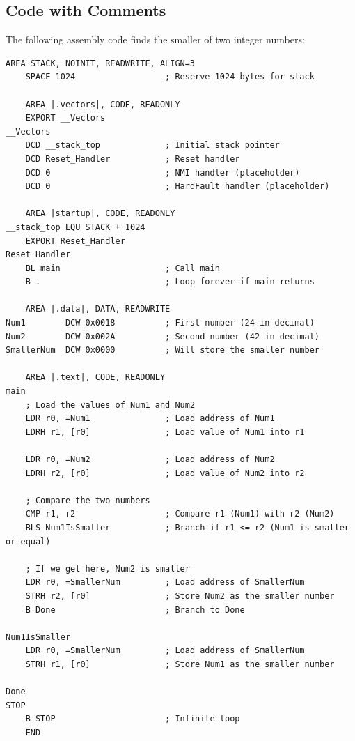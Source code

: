 \documentclass[12pt,a4paper]{article}
\begin{document}
\subsection{Code with Comments}
The following assembly code finds the smaller of two integer numbers:

\begin{lstlisting}[language={}]
    AREA STACK, NOINIT, READWRITE, ALIGN=3
    SPACE 1024                  ; Reserve 1024 bytes for stack
    
    AREA |.vectors|, CODE, READONLY
    EXPORT __Vectors
__Vectors
    DCD __stack_top             ; Initial stack pointer
    DCD Reset_Handler           ; Reset handler
    DCD 0                       ; NMI handler (placeholder)
    DCD 0                       ; HardFault handler (placeholder)
    
    AREA |startup|, CODE, READONLY
__stack_top EQU STACK + 1024
    EXPORT Reset_Handler
Reset_Handler
    BL main                     ; Call main
    B .                         ; Loop forever if main returns
    
    AREA |.data|, DATA, READWRITE
Num1        DCW 0x0018          ; First number (24 in decimal)
Num2        DCW 0x002A          ; Second number (42 in decimal)
SmallerNum  DCW 0x0000          ; Will store the smaller number
    
    AREA |.text|, CODE, READONLY
main
    ; Load the values of Num1 and Num2
    LDR r0, =Num1               ; Load address of Num1
    LDRH r1, [r0]               ; Load value of Num1 into r1
    
    LDR r0, =Num2               ; Load address of Num2
    LDRH r2, [r0]               ; Load value of Num2 into r2
    
    ; Compare the two numbers
    CMP r1, r2                  ; Compare r1 (Num1) with r2 (Num2)
    BLS Num1IsSmaller           ; Branch if r1 <= r2 (Num1 is smaller or equal)
    
    ; If we get here, Num2 is smaller
    LDR r0, =SmallerNum         ; Load address of SmallerNum
    STRH r2, [r0]               ; Store Num2 as the smaller number
    B Done                      ; Branch to Done
    
Num1IsSmaller
    LDR r0, =SmallerNum         ; Load address of SmallerNum
    STRH r1, [r0]               ; Store Num1 as the smaller number
    
Done
STOP
    B STOP                      ; Infinite loop
    END
\end{lstlisting}
\end{document}
